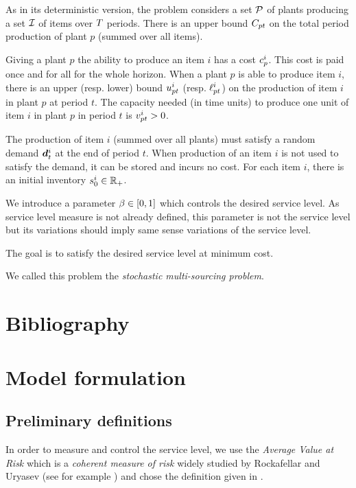 \medskip


As in its deterministic version, the problem considers a set $\mathcal{P}$ of plants producing a set $\mathcal{I}$ of items over $T$ periods.
There is an upper bound $C_{pt}$ on the total period production of plant $p$ (summed over all items).

Giving a plant $p$ the ability to produce an item $i$ has a cost $c_p^i$.
This cost is paid once and for all for the whole horizon.
When a plant $p$ is able to produce item $i$, there is an upper (resp. lower) bound $u_{pt}^i$ (resp. $\ell_{pt}^i$) on the production of item $i$ in plant $p$ at period $t$.
The capacity needed (in time units) to produce one unit of item $i$ in plant $p$ in period $t$ is $v_{pt}^i>0$.


The production of item $i$ (summed over all plants) must satisfy a random demand $\va\demand_t^i$ at the end of period $t$.
When production of an item $i$ is not used to satisfy the demand, it can be stored and incurs no cost.
For each item $i$, there is an initial inventory $s_0^i\in\mathbb{R}_+$.


We introduce a parameter $\servicelvl\in\sqbracket{0,1}$ which controls the desired service level.
As service level measure is not already defined, this parameter is not the service level but its variations should imply same sense variations of the service level.


The goal is to satisfy the desired service level at minimum cost.


We called this problem the \emph{stochastic multi-sourcing problem}.


\section{Bibliography}


\section{Model formulation}


\subsection{Preliminary definitions}


In order to measure and control the service level, we use the \emph{Average Value at Risk} which is a \emph{coherent measure of risk} widely studied by Rockafellar and Uryasev (see for example \cite{Rockafellar2000,Rockafellar2002}) and chose the definition given in \cite{Follmer2004}.


